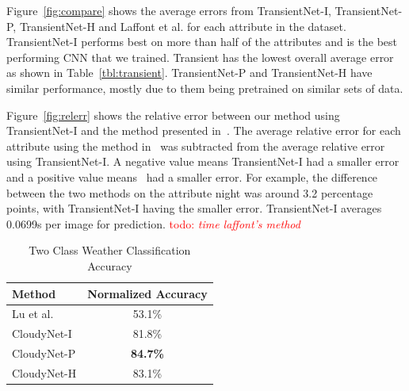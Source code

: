 \documentclass{article}
\newcommand{\todo}[1]{\textcolor{red}{todo: {\em #1}}}
\newcommand{\figref}[1]{Figure~\ref{fig:#1}}
\newcommand{\tblref}[1]{Table~\ref{tbl:#1}}
\begin{document}
\figref{compare} shows the average errors from TransientNet-I, TransientNet-P, 
TransientNet-H and Laffont et al. for each attribute in the dataset.  TransientNet-I 
performs best on more than half of the attributes and is the best performing CNN that we trained.  
Transient has the lowest overall average error as shown in \tblref{transient}.  TransientNet-P
and TransientNet-H have similar performance, mostly due to them being pretrained on similar 
sets of data.

\figref{relerr} shows the relative error between our method using TransientNet-I
and the method presented in~\cite{Laffont14}.  The average relative error 
for each attribute using the method in~\cite{Laffont14} was subtracted from
the average relative error using TransientNet-I.  A negative value means TransientNet-I
had a smaller error and a positive value means~\cite{Laffont14} had a smaller
error.  For example, the difference between the two methods on the attribute
night was around 3.2 percentage points, with TransientNet-I having the smaller 
error.  TransientNet-I averages 0.0699s per image for prediction. \todo{time laffont's method}

 
%
%
%

\begin{table}[t]
	\centering
	\begin{tabular}{ | l | c | }
		\hline
			Method & Normalized Accuracy \\ \hline
			Lu et al.~\cite{lutwoclass}& 53.1\% \\ \hline
			CloudyNet-I & 81.8\% \\ \hline
			CloudyNet-P & \textbf{84.7\%} \\ \hline
			CloudyNet-H & 83.1\% \\ 
		\hline
	\end{tabular}
	\caption{Two Class Weather Classification Accuracy}
	\label{tbl:twoclass}
\end{table}
\end{document}
